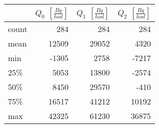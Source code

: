 \begin{tabular}{lrrr}
\toprule
{} &  $Q_0$ $\left[\si{\frac{Bq}{hod}}\right]$ &  $Q_1$ $\left[\si{\frac{Bq}{hod}}\right]$ &  $Q_2$ $\left[\si{\frac{Bq}{hod}}\right]$ \\
\midrule
count &                                       284 &                                       284 &                                       284 \\
mean  &                                     12509 &                                     29052 &                                      4320 \\
min   &                                     -1305 &                                      2758 &                                     -7217 \\
25\%   &                                      5053 &                                     13800 &                                     -2574 \\
50\%   &                                      8450 &                                     29570 &                                      -410 \\
75\%   &                                     16517 &                                     41212 &                                     10192 \\
max   &                                     42325 &                                     61230 &                                     36875 \\
\bottomrule
\end{tabular}
